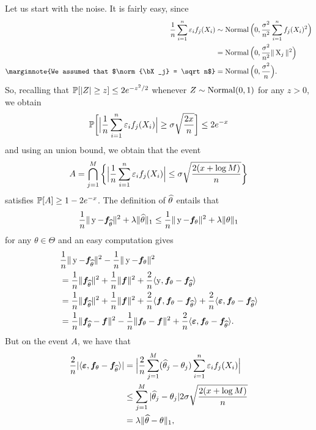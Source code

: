 Let us start with the noise. It is fairly easy, since
\begin{align*}
	\frac 1n \sum_{i=1}^n \eps_i f_j(X_i) 
	&\sim \nor\Big( 0, \frac{\sigma^2}{n^2} \sum_{i=1}^n f_j(X_i)^2 \Big) \\
	&= \nor\Big( 0, \frac{\sigma^2}{n^2} \norm{\bX_j}^2 \Big) \\
	\marginnote{We assumed that $\norm{\bX_j} = \sqrt n$}
	&= \nor\Big( 0, \frac{\sigma^2}{n} \Big).
\end{align*}
So, recalling that $\P[|Z| \geq z] \leq 2e^{-z^2 / 2}$ whenever $Z \sim \nor(0, 1)$ for any $z > 0$,%
we obtain
\begin{equation*}
	\P \bigg[ \Big| \frac 1n \sum_{i=1}^n \eps_i f_j(X_i) \Big| \geq \sigma \sqrt{\frac{2 x}{n}} \bigg] \leq 2 e^{-x}
\end{equation*}
and using an union bound, we obtain that the event
\begin{equation*}
	A = \bigcap_{j=1}^M \bigg\{ \Big| \frac 1n \sum_{i=1}^n \eps_i f_j(X_i) \Big| \leq \sigma \sqrt{\frac{2 (x + \log M)}{n}} \bigg\}
\end{equation*}
satisfies $\P[A] \geq 1 - 2e^{-x}$.
The definition of $\wh \theta$ entails that
\begin{equation}
	\label{eq:proof-oracle-slow-step1}
	\frac 1n  \norm{\by - \bf_{\wh \theta}}^2 + \lambda \norm{\wh \theta}_1 
	\leq \frac 1n  \norm{\by - \bf_\theta}^2 + \lambda \norm{\theta}_1
\end{equation}
for any $\theta \in \Theta$ and an easy computation gives
\begin{equation}
	\label{eq:proof-oracle-slow-step2}
	\begin{split}
	&\frac 1n \norm{\by - \bf_{\wh \theta}}^2 - \frac 1n \norm{\by - \bf_\theta}^2 \\
	&= \frac 1n  \norm{\bf_{\wh \theta}}^2 + \frac 1n  \norm{\bf}^2 + \frac 2n  \inr{\by, \bf_{\theta} - \bf_{\wh \theta}} \\
	&= \frac 1n \norm{\bf_{\wh \theta}}^2 + \frac 1n \norm{\bf}^2 + \frac 2n  \inr{\bf, \bf_{\theta} - \bf_{\wh \theta}} + \frac 2n  \inr{\beps, \bf_{\theta} - \bf_{\wh \theta}} \\
	&= \frac 1n \norm{\bf_{\wh \theta} - \bf}^2 - \frac 1n \norm{\bf_\theta - \bf}^2 + 
	\frac 2n  \inr{\beps, \bf_{\theta} - \bf_{\wh \theta}}.
	\end{split}
\end{equation}
But on the event $A$, we have that
\begin{equation}
	\label{eq:proof-oracle-slow-step3}
	\begin{split}
	\frac 2n | \inr{\beps, \bf_{\theta} - \bf_{\wh \theta}} | 
	&= \Big| \frac 2n \sum_{j=1}^M (\wh \theta_j - \theta_j ) 
	\sum_{i=1}^n \eps_i f_j(X_i) \Big| \\
	&\leq \sum_{j=1}^M | \wh \theta_j - \theta_j | 2 \sigma \sqrt{\frac{2 (x + \log M)}{n}} \\
	&= \lambda \norm{\wh \theta - \theta}_1,	
	\end{split}
\end{equation}
